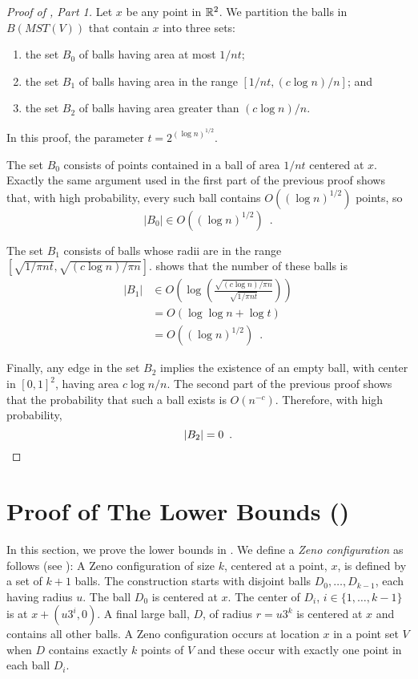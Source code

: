 \documentclass{cccg12}
\newcommand{\mst}{\mathit{MST}}
\begin{document}
\begin{proof}[Proof of , Part 1]
Let $x$ be any point in $\mathbb{R}^2$.  We partition the balls in $B(\mst(V))$
that contain $x$ into three sets:
\begin{enumerate}
  \item the set $B_0$ of balls having area at most $1/nt$;
  \item the set $B_1$ of balls having area in the range $[1/nt,(c\log
  n)/n]$; and
  \item the set $B_2$ of balls having area greater than $(c\log n)/n$.
\end{enumerate}
In this proof, the parameter $t=2^{(\log n)^{1/2}}$.

The set $B_0$ consists of points contained in a ball of area $1/nt$
centered at $x$.  Exactly the same argument used in the first part of
the previous proof shows that, with high probability, every such ball contains
$O((\log n)^{1/2})$ points, so
\[
     |B_0| \in O((\log n)^{1/2}) \enspace .
\]

The set $B_1$ consists of balls whose radii are in the range $[\sqrt{1/\pi
nt},\sqrt{(c\log n)/\pi n}]$.   shows that the number of
these balls is
\begin{align*}
    |B_1| & \in O\left(\log\left(\frac{\sqrt{(c\log n)/\pi n}}{\sqrt{1/\pi nt}}\right)\right) \\
    & = O(\log\log n + \log t) \\
    & = O((\log n)^{1/2}) \enspace .
\end{align*}

Finally, any edge in the set $B_2$ implies the existence of an empty ball,
with center in $[0,1]^2$, having area $c\log n/n$.  The second part of the
previous proof shows that the probability that such a ball exists is
$O(n^{-c})$.  Therefore, with high probability,
\[
   |B_2| = 0 \enspace . \qedhere
\]
\end{proof}

\section{Proof of The Lower Bounds ()}

In this section, we prove the lower bounds in .
We define a \emph{Zeno configuration} as follows (see ):
A Zeno configuration of size $k$, centered at a point, $x$, is defined
by a set of $k+1$ balls.  The construction starts with disjoint balls
$D_0,\ldots,D_{k-1}$, each having radius $u$.  The ball $D_0$ is centered
at $x$.  The center of $D_i$, $i\in\{1,\ldots,k-1\}$ is at $x+(u3^i, 0)$.
A final large ball, $D$, of radius $r=u3^k$ is centered at $x$ and
contains all other balls.  A Zeno configuration occurs at location $x$
in a point set $V$ when $D$ contains exactly $k$ points of $V$ and these
occur with exactly one point in each ball $D_i$.
\end{document}
